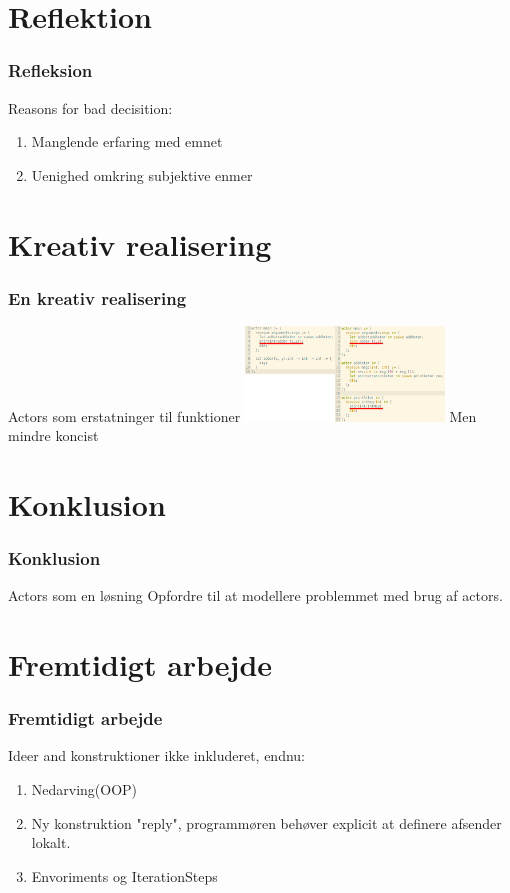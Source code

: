 \section{Reflektion}
\begin{frame}
	\frametitle{Refleksion}
	Reasons for bad decisition:
	\begin{enumerate}
    \item Manglende erfaring med emnet
    \item Uenighed omkring subjektive enmer
  \end{enumerate}
\end{frame}

\section{Kreativ realisering}
\begin{frame}
	\frametitle{En kreativ realisering}
	Actors som erstatninger til funktioner
	\includegraphics[width=200px]{Images/actorFunc.png}\newline
	Men mindre koncist
\end{frame}

\section{Konklusion}
\begin{frame}
	\frametitle{Konklusion}
	Actors som en løsning
	Opfordre til at modellere problemmet med brug af actors.
\end{frame}

\section{Fremtidigt arbejde}
\begin{frame}
	\frametitle{Fremtidigt arbejde}
	Ideer and konstruktioner ikke inkluderet, endnu: 
  \begin{enumerate}
    \item Nedarving(OOP)
    \item Ny konstruktion "reply", programmøren behøver explicit at definere afsender lokalt.
    \item Envoriments og IterationSteps
  \end{enumerate}
\end{frame}

